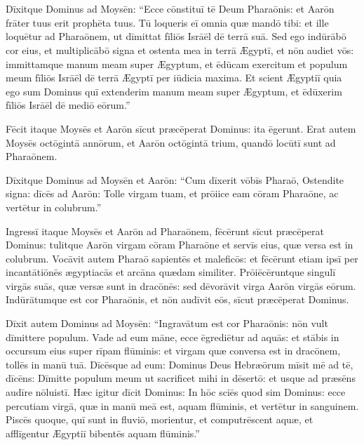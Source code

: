 \chapter{}



Dīxitque Dominus ad Moysēn: ``Ecce cōnstituī tē Deum Pharaōnis: et Aarōn
frāter tuus erit prophēta tuus. Tū loqueris eī omnia quæ mandō tibi:
et ille loquētur ad Pharaōnem, ut dīmittat fīliōs Isrāēl dē terrā suā. 
Sed ego indūrābō cor eius, et multiplicābō signa et ostenta mea in terrā
Ægyptī, et nōn audiet vōs: immittamque manum meam super Ægyptum, et
ēdūcam exercitum et populum meum fīliōs Isrāēl dē terrā Ægyptī per
iūdicia maxima. Et scient Ægyptiī quia ego sum Dominus quī extenderim
manum meam super Ægyptum, et ēdūxerim fīliōs Isrāēl dē mediō eōrum.''

Fēcit itaque Moysēs et Aarōn sīcut præcēperat Dominus: ita ēgerunt. 
Erat autem Moysēs octōgintā annōrum, et Aarōn octōgintā trium, quandō
locūtī sunt ad Pharaōnem.

Dīxitque Dominus ad Moysēn et Aarōn: ``Cum dīxerit vōbīs Pharaō,
Ostendite signa: dīcēs ad Aarōn: Tolle virgam tuam, et prōiice eam
cōram Pharaōne, ac vertētur in
colubrum.''

Ingressī itaque Moysēs et
Aarōn ad Pharaōnem, fēcērunt sīcut præcēperat Dominus: tulitque Aarōn
virgam cōram Pharaōne et servīs eius, quæ versa est in colubrum.
Vocāvit autem Pharaō sapientēs et maleficōs: et fēcērunt etiam ipsī per
incantātiōnēs ægyptiacās et arcāna quædam similiter. Prōiēcēruntque
singulī virgās suās, quæ versæ sunt in dracōnēs: sed dēvorāvit virga
Aarōn virgās eōrum. Indūrātumque est cor Pharaōnis, et nōn audīvit
eōs, sīcut præcēperat Dominus.

Dīxit autem Dominus ad Moysēn: ``Ingravātum est cor Pharaōnis: nōn vult
dīmittere populum. Vade ad eum māne, ecce ēgrediētur ad aquās: et
stābis in occursum eius super rīpam flūminis: et virgam quæ conversa
est in dracōnem, tollēs in manū tuā.  Dīcēsque ad eum: Dominus Deus
Hebræōrum mīsit mē ad tē, dīcēns: Dīmitte populum meum ut sacrificet
mihi in dēsertō: et usque ad præsēns audīre nōluistī. Hæc igitur
dīcit Dominus: In hōc sciēs quod sim Dominus: ecce percutiam virgā,
quæ in manū meā est, aquam flūminis, et vertētur in sanguinem. Piscēs
quoque, quī sunt in fluviō, morientur, et computrēscent aquæ, et
afflīgentur Ægyptiī bibentēs aquam flūminis.''


